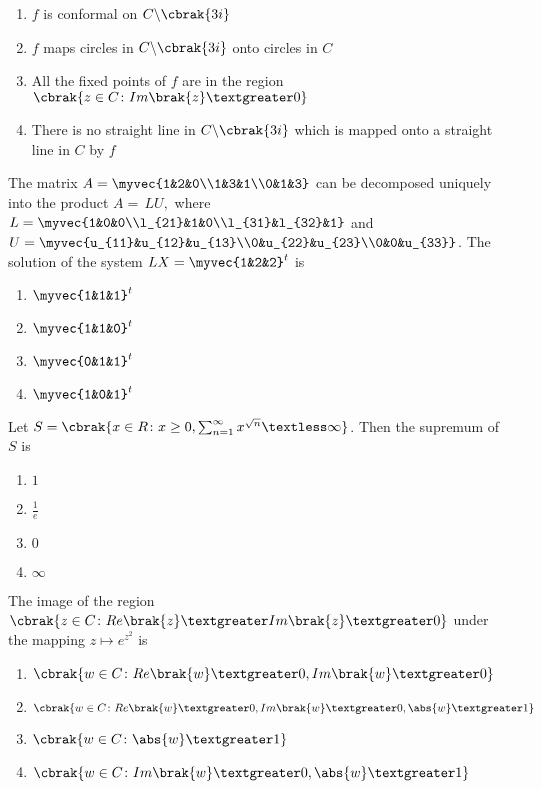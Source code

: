     \begin{enumerate}
        \item $f$ is conformal on $C\backslash\cbrak{3i}$
        \item $f$ maps circles in $C\backslash\cbrak{3i}$ onto circles in $C$
        \item All the fixed points of $f$ are in the region $\cbrak{z\in C\colon Im\brak{z}\textgreater 0}$
        \item There is no straight line in $C\backslash\cbrak{3i}$ which is mapped onto a straight line in $C$ by $f$ 
    \end{enumerate}
    \item The matrix $A=\myvec{1&2&0\\1&3&1\\0&1&3}$ can be decomposed uniquely into the product $A=\,LU,$ where $L=\myvec{1&0&0\\l_{21}&1&0\\l_{31}&l_{32}&1}$ and $U=\myvec{u_{11}&u_{12}&u_{13}\\0&u_{22}&u_{23}\\0&0&u_{33}}$. The solution of the system $LX=\myvec{1&2&2}^t$ is 
    \begin{enumerate}
        \item $\myvec{1&1&1}^t$
        \item $\myvec{1&1&0}^t$
        \item $\myvec{0&1&1}^t$
        \item $\myvec{1&0&1}^t$
    \end{enumerate}
    \item Let $S=\cbrak{x\in R\colon x\geq0,\sum_{n=1}^{\infty}x^{\sqrt{n}}\textless \infty}$. Then the supremum of $S$ is
    \begin{enumerate}
        \item $1$
        \item $\frac{1}{e}$
        \item $0$
        \item $\infty$
    \end{enumerate}
    \item The image of the region $\cbrak{z\in C\colon Re\brak{z}\textgreater Im\brak{z}\textgreater0}$ under the mapping $z \mapsto e^{z^2}$ is
        \begin{enumerate}
            \item $\cbrak{w\in C\colon Re\brak{w}\textgreater0,Im\brak{w}\textgreater0}$
            \item $\cbrak{w\in C\colon Re\brak{w}\textgreater0,Im\brak{w}\textgreater0,\abs{w}\textgreater1}$
            \item $\cbrak{w\in C\colon \abs{w}\textgreater1}$
            \item $\cbrak{w\in C\colon Im\brak{w}\textgreater0,\abs{w}\textgreater1}$
        \end{enumerate}
